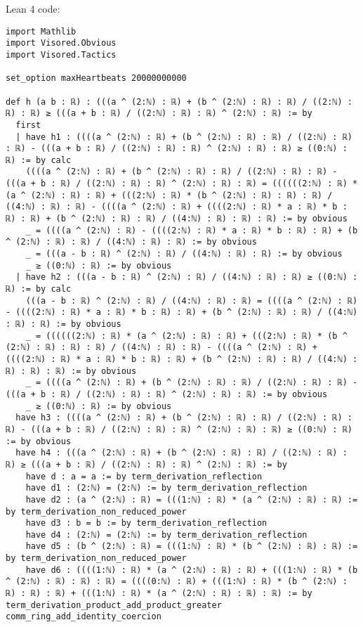 \documentclass{article}
\begin{document}
Lean 4 code:
\begin{tcolorbox}[colback=white!10, width=\linewidth]
\begin{lstlisting}[language=Lean4]
import Mathlib
import Visored.Obvious
import Visored.Tactics

set_option maxHeartbeats 20000000000

def h (a b : ℝ) : (((a ^ (2:ℕ) : ℝ) + (b ^ (2:ℕ) : ℝ) : ℝ) / ((2:ℕ) : ℝ) : ℝ) ≥ (((a + b : ℝ) / ((2:ℕ) : ℝ) : ℝ) ^ (2:ℕ) : ℝ) := by
  first
  | have h1 : ((((a ^ (2:ℕ) : ℝ) + (b ^ (2:ℕ) : ℝ) : ℝ) / ((2:ℕ) : ℝ) : ℝ) - (((a + b : ℝ) / ((2:ℕ) : ℝ) : ℝ) ^ (2:ℕ) : ℝ) : ℝ) ≥ ((0:ℕ) : ℝ) := by calc
    ((((a ^ (2:ℕ) : ℝ) + (b ^ (2:ℕ) : ℝ) : ℝ) / ((2:ℕ) : ℝ) : ℝ) - (((a + b : ℝ) / ((2:ℕ) : ℝ) : ℝ) ^ (2:ℕ) : ℝ) : ℝ) = ((((((2:ℕ) : ℝ) * (a ^ (2:ℕ) : ℝ) : ℝ) + (((2:ℕ) : ℝ) * (b ^ (2:ℕ) : ℝ) : ℝ) : ℝ) / ((4:ℕ) : ℝ) : ℝ) - ((((a ^ (2:ℕ) : ℝ) + ((((2:ℕ) : ℝ) * a : ℝ) * b : ℝ) : ℝ) + (b ^ (2:ℕ) : ℝ) : ℝ) / ((4:ℕ) : ℝ) : ℝ) : ℝ) := by obvious
    _ = ((((a ^ (2:ℕ) : ℝ) - ((((2:ℕ) : ℝ) * a : ℝ) * b : ℝ) : ℝ) + (b ^ (2:ℕ) : ℝ) : ℝ) / ((4:ℕ) : ℝ) : ℝ) := by obvious
    _ = (((a - b : ℝ) ^ (2:ℕ) : ℝ) / ((4:ℕ) : ℝ) : ℝ) := by obvious
    _ ≥ ((0:ℕ) : ℝ) := by obvious
  | have h2 : (((a - b : ℝ) ^ (2:ℕ) : ℝ) / ((4:ℕ) : ℝ) : ℝ) ≥ ((0:ℕ) : ℝ) := by calc
    (((a - b : ℝ) ^ (2:ℕ) : ℝ) / ((4:ℕ) : ℝ) : ℝ) = ((((a ^ (2:ℕ) : ℝ) - ((((2:ℕ) : ℝ) * a : ℝ) * b : ℝ) : ℝ) + (b ^ (2:ℕ) : ℝ) : ℝ) / ((4:ℕ) : ℝ) : ℝ) := by obvious
    _ = ((((((2:ℕ) : ℝ) * (a ^ (2:ℕ) : ℝ) : ℝ) + (((2:ℕ) : ℝ) * (b ^ (2:ℕ) : ℝ) : ℝ) : ℝ) / ((4:ℕ) : ℝ) : ℝ) - ((((a ^ (2:ℕ) : ℝ) + ((((2:ℕ) : ℝ) * a : ℝ) * b : ℝ) : ℝ) + (b ^ (2:ℕ) : ℝ) : ℝ) / ((4:ℕ) : ℝ) : ℝ) : ℝ) := by obvious
    _ = ((((a ^ (2:ℕ) : ℝ) + (b ^ (2:ℕ) : ℝ) : ℝ) / ((2:ℕ) : ℝ) : ℝ) - (((a + b : ℝ) / ((2:ℕ) : ℝ) : ℝ) ^ (2:ℕ) : ℝ) : ℝ) := by obvious
    _ ≥ ((0:ℕ) : ℝ) := by obvious
  have h3 : ((((a ^ (2:ℕ) : ℝ) + (b ^ (2:ℕ) : ℝ) : ℝ) / ((2:ℕ) : ℝ) : ℝ) - (((a + b : ℝ) / ((2:ℕ) : ℝ) : ℝ) ^ (2:ℕ) : ℝ) : ℝ) ≥ ((0:ℕ) : ℝ) := by obvious
  have h4 : (((a ^ (2:ℕ) : ℝ) + (b ^ (2:ℕ) : ℝ) : ℝ) / ((2:ℕ) : ℝ) : ℝ) ≥ (((a + b : ℝ) / ((2:ℕ) : ℝ) : ℝ) ^ (2:ℕ) : ℝ) := by
    have d : a = a := by term_derivation_reflection
    have d1 : (2:ℕ) = (2:ℕ) := by term_derivation_reflection
    have d2 : (a ^ (2:ℕ) : ℝ) = (((1:ℕ) : ℝ) * (a ^ (2:ℕ) : ℝ) : ℝ) := by term_derivation_non_reduced_power
    have d3 : b = b := by term_derivation_reflection
    have d4 : (2:ℕ) = (2:ℕ) := by term_derivation_reflection
    have d5 : (b ^ (2:ℕ) : ℝ) = (((1:ℕ) : ℝ) * (b ^ (2:ℕ) : ℝ) : ℝ) := by term_derivation_non_reduced_power
    have d6 : ((((1:ℕ) : ℝ) * (a ^ (2:ℕ) : ℝ) : ℝ) + (((1:ℕ) : ℝ) * (b ^ (2:ℕ) : ℝ) : ℝ) : ℝ) = ((((0:ℕ) : ℝ) + (((1:ℕ) : ℝ) * (b ^ (2:ℕ) : ℝ) : ℝ) : ℝ) + (((1:ℕ) : ℝ) * (a ^ (2:ℕ) : ℝ) : ℝ) : ℝ) := by term_derivation_product_add_product_greater comm_ring_add_identity_coercion

\end{lstlisting}
\end{tcolorbox}
\end{document}
